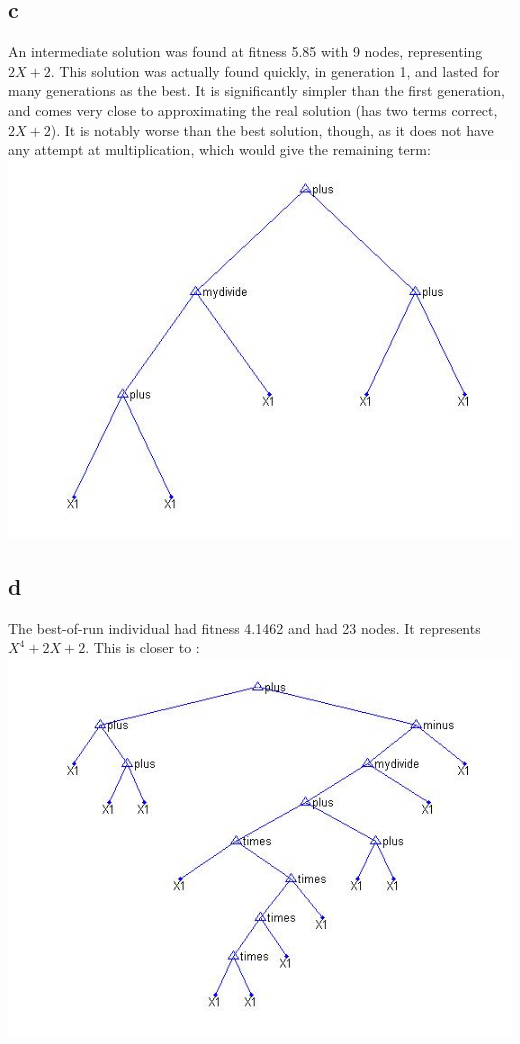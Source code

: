 \documentclass[12pt]{article}
\begin{document}
\subsection{c}
An intermediate solution was found at fitness 5.85 with 9 nodes, representing $2X + 2$. This solution was actually found quickly, in generation 1, and lasted for many generations as the best. It is significantly simpler than the first generation, and comes very close to approximating the real solution (has two terms correct, $2X + 2$). It is notably worse than the best solution, though, as it does not have any attempt at multiplication, which would give the remaining term:\\
\includegraphics[scale=0.5]{intermediate}

\subsection{d}
The best-of-run individual had fitness 4.1462 and had 23 nodes. It represents $X^4 + 2X + 2$. This is closer to :\\
\includegraphics[scale=0.5]{best}
\end{document}
